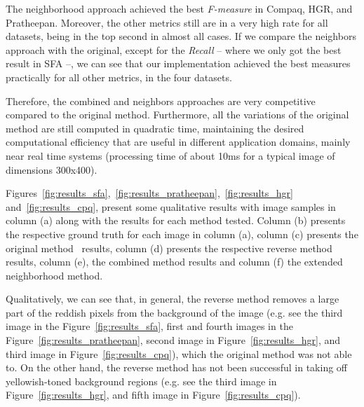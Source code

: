 The neighborhood approach achieved the best \textit{F-measure} in Compaq, HGR, and Pratheepan. Moreover, the other metrics still are in a very high rate for all datasets, being in the top second in almost all cases. If we compare the neighbors approach with the original, except for the \textit{Recall} -- where we only got the best result in SFA --, we can see that our implementation achieved the best measures practically for all other metrics, in the four datasets.

Therefore, the combined and neighbors approaches are very competitive compared to the original method. Furthermore, all the variations of the original method are still computed in quadratic time, maintaining the desired computational efficiency that are useful in different application domains, mainly near real time systems (processing time of about 10ms for a typical image of dimensions 300x400).

Figures~\ref{fig:results_sfa},~\ref{fig:results_pratheepan},~\ref{fig:results_hgr} and~\ref{fig:results_cpq}, present some qualitative results with image samples in column (a) along with the results for each method tested. Column (b) presents the respective ground truth for each image in column (a), column (c) presents the original method~\cite{brancati:17} results, column (d) presents the respective reverse method results, column (e), the combined method results and column (f) the extended neighborhood method.

Qualitatively, we can see that, in general, the reverse method removes a large part of the reddish pixels from the background of the image (e.g. see the third image in the Figure~\ref{fig:results_sfa}, first and fourth images in the Figure~\ref{fig:results_pratheepan}, second image in Figure~\ref{fig:results_hgr}, and third image in Figure~\ref{fig:results_cpq}), which the original method was not able to. On the other hand, the reverse method has not been successful in taking off yellowish-toned background regions (e.g. see the third image in Figure~\ref{fig:results_hgr}, and fifth image in Figure~\ref{fig:results_cpq}).

